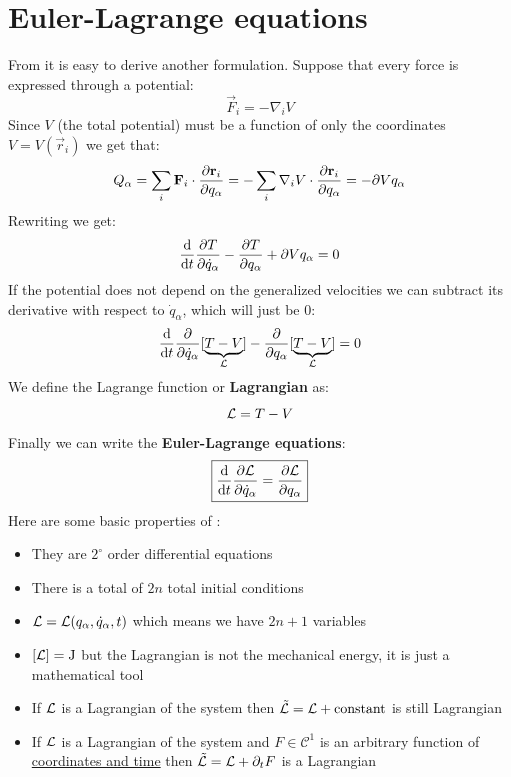 \section{Euler-Lagrange equations}
From \lagrangeref\;it is easy to derive another formulation. Suppose that every force is expressed through a potential:
\begin{equation}
    \vec{F}_i = -\nabla_i V
\end{equation}
Since $V$ (the total potential) must be a function of only the coordinates $V = V(\vec{r}_i)$ we get that:
\begin{equation}
    Q_{\alpha} = \displaystyle\sum_i \vb{F}_i \cdot \dfrac{\partial \vb{r}_i}{\partial q_{\alpha}} = - \displaystyle\sum_i \nabla_i V \cdot \dfrac{\partial \vb{r}_i}{\partial q_{\alpha}} = -\partial{V}{q_{\alpha}}
\end{equation}
Rewriting \lagrangeref\;we get:
\begin{equation}
    \dv{}{t}\dfrac{\partial T}{\partial \dot{q}_{\alpha}} - \dfrac{\partial T}{\partial q_{\alpha}} + \partial{V}{q_{\alpha}} = 0
\end{equation}
If the potential does not depend on the generalized velocities we can subtract its derivative with respect to $\dot{q}_{\alpha}$, which will just be 0:
\begin{equation}
    \dv{}{t}\dfrac{\partial }{\partial \dot{q}_{\alpha}}[\underbrace{T-V}_\lagr ] - \dfrac{\partial}{\partial q_{\alpha}}[\underbrace{T-V}_\lagr ] = 0
\end{equation}
We define the Lagrange function or \textbf{Lagrangian} as:
\begin{equation}
    \mathcal{L}  = T - V
\end{equation}
Finally we can write the \textbf{Euler-Lagrange equations}:
\begin{equation} \label{Euler_Lagrange_equations}
    \boxed{\dv{}{t}\pdv{\lagr}{\dot{q}_{\alpha}} = \pdv{\lagr}{q_{\alpha}}}
\end{equation}
Here are some basic properties of \eleref :
\begin{itemize}
    \item They are $2^\circ$ order differential equations
    \item There is a total of $2n$ total initial conditions
    \item $\mathcal{L} = \mathcal{L}(q_{\alpha},\dot{q}_{\alpha},t)$ which means we have $2n+1$ variables
    \item $[\mathcal{L}] = \mathrm{J}$ but the Lagrangian is not the mechanical energy, it is just a mathematical tool
    \item If $\mathcal{L}$ is a Lagrangian of the system then $\tilde{\mathcal{L}} = \mathcal{L} + \mathrm{constant}$ is still Lagrangian
    \item If $\mathcal{L}$ is a Lagrangian of the system and $F\in \mathcal{C}^1$ is an arbitrary function of \underline{coordinates and time} then $\tilde{\mathcal{L}} = \mathcal{L} + \partial_t F$ is a Lagrangian
\end{itemize}
